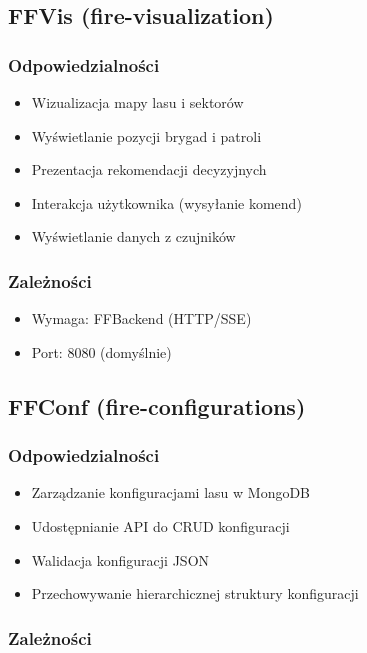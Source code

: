 \subsection{FFVis (fire-visualization)}

\subsubsection{Odpowiedzialności}

\begin{itemize}
    \item Wizualizacja mapy lasu i sektorów
    \item Wyświetlanie pozycji brygad i patroli
    \item Prezentacja rekomendacji decyzyjnych
    \item Interakcja użytkownika (wysyłanie komend)
    \item Wyświetlanie danych z czujników
\end{itemize}

\subsubsection{Zależności}

\begin{itemize}
    \item Wymaga: FFBackend (HTTP/SSE)
    \item Port: 8080 (domyślnie)
\end{itemize}

\subsection{FFConf (fire-configurations)}

\subsubsection{Odpowiedzialności}

\begin{itemize}
    \item Zarządzanie konfiguracjami lasu w MongoDB
    \item Udostępnianie API do CRUD konfiguracji
    \item Walidacja konfiguracji JSON
    \item Przechowywanie hierarchicznej struktury konfiguracji
\end{itemize}


\subsubsection{Zależności}

